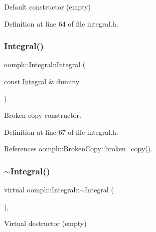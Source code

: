 Default constructor (empty) 



Definition at line 64 of file integral.\+h.

\mbox{\label{classoomph_1_1Integral_a11de5c0669e8fcecc436564c09ed1d13}} 
\subsubsection{\texorpdfstring{Integral()}{Integral()}\hspace{0.1cm}{\footnotesize\ttfamily [2/2]}}
{\footnotesize\ttfamily oomph\+::\+Integral\+::\+Integral (\begin{DoxyParamCaption}\item[{const \hyperlink{classoomph_1_1Integral}{Integral} \&}]{dummy }\end{DoxyParamCaption})\hspace{0.3cm}{\ttfamily [inline]}}



Broken copy constructor. 



Definition at line 67 of file integral.\+h.



References oomph\+::\+Broken\+Copy\+::broken\+\_\+copy().

\mbox{\label{classoomph_1_1Integral_a61b5870e0953a50d0c678ef59eefe147}} 
\subsubsection{\texorpdfstring{$\sim$\+Integral()}{~Integral()}}
{\footnotesize\ttfamily virtual oomph\+::\+Integral\+::$\sim$\+Integral (\begin{DoxyParamCaption}{ }\end{DoxyParamCaption})\hspace{0.3cm}{\ttfamily [inline]}, {\ttfamily [virtual]}}



Virtual destructor (empty) 



